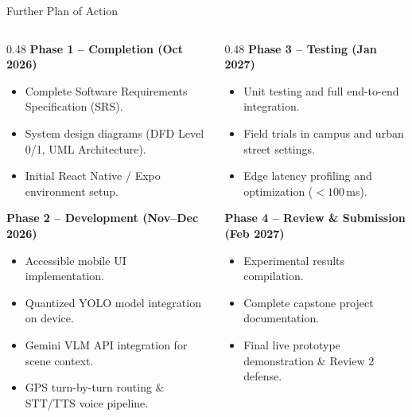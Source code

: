 \begin{frame}{Further Plan of Action}
\begin{columns}[T]
  \begin{column}{0.48\textwidth}
    \textbf{\textcolor{MyUnivGreen}{Phase 1 -- Completion (Oct 2026)}}\\[3pt]
    \begin{itemize}
      \item Complete Software Requirements Specification (SRS).
      \item System design diagrams (DFD Level 0/1, UML Architecture).
      \item Initial React Native / Expo environment setup.
    \end{itemize}
    \vspace{6pt}
    \textbf{\textcolor{MyUnivGreen}{Phase 2 -- Development (Nov--Dec 2026)}}\\[3pt]
    \begin{itemize}
      \item Accessible mobile UI implementation.
      \item Quantized YOLO model integration on device.
      \item Gemini VLM API integration for scene context.
      \item GPS turn-by-turn routing \& STT/TTS voice pipeline.
    \end{itemize}
  \end{column}
  
  \begin{column}{0.48\textwidth}
    \textbf{\textcolor{MyUnivGreen}{Phase 3 -- Testing (Jan 2027)}}\\[3pt]
    \begin{itemize}
      \item Unit testing and full end-to-end integration.
      \item Field trials in campus and urban street settings.
      \item Edge latency profiling and optimization ($<100$\,ms).
    \end{itemize}
    \vspace{6pt}
    \textbf{\textcolor{MyUnivGreen}{Phase 4 -- Review \& Submission (Feb 2027)}}\\[3pt]
    \begin{itemize}
      \item Experimental results compilation.
      \item Complete capstone project documentation.
      \item Final live prototype demonstration \& Review 2 defense.
    \end{itemize}
  \end{column}
\end{columns}
\end{frame}